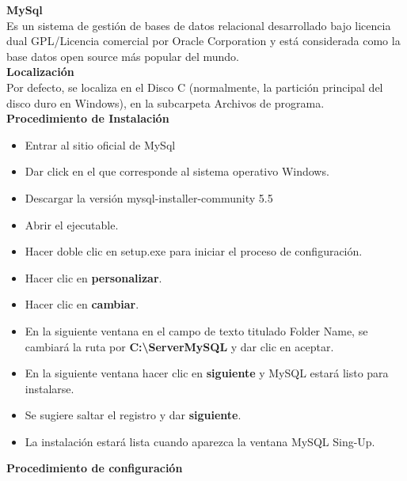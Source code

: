 \textbf{MySql}
\\
Es un sistema de gestión de bases de datos relacional desarrollado bajo licencia dual
GPL/Licencia comercial por Oracle Corporation y está considerada como la base datos
open source más popular del mundo.
\\
\textbf{Localización}
\\
Por defecto, se localiza en el Disco C (normalmente, la partición principal del 
disco duro en Windows), en la subcarpeta Archivos de programa.
\textbf{Procedimiento de Instalación}
\\ 
\begin{itemize}
    \item Entrar al sitio oficial de MySql 
    \item Dar click en el que corresponde al sistema operativo Windows.
    \item Descargar la versión mysql-installer-community 5.5 
    \item Abrir el ejecutable.
    \item Hacer doble clic en setup.exe para iniciar el proceso de configuración.
    \item Hacer clic en \textbf{personalizar}.
    \item Hacer clic en \textbf{cambiar}.
    \item En la siguiente ventana en el campo de texto titulado Folder Name, 
    se cambiará la ruta por \textbf{C:\textbackslash{ServerMySQL}} y dar clic en aceptar.
    \item En la siguiente ventana hacer clic en \textbf{siguiente} y MySQL estará 
    listo para instalarse.
    \item Se sugiere saltar el registro y dar \textbf{siguiente}.
    \item La instalación estará lista cuando aparezca la ventana MySQL Sing-Up.
\end{itemize}
\textbf{Procedimiento de configuración}
